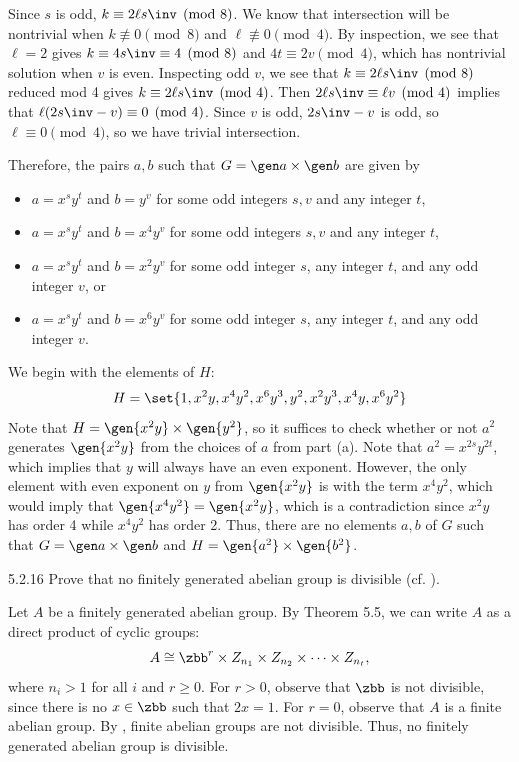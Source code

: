 \begin{solenum}
\begin{enumerate}[label=(\arabic*)]
	Since $s$ is odd, $k \equiv 2 \ell s\inv \pmod 8$.
	We know that intersection will be nontrivial when $k \not\equiv 0 \pmod 8$ and $\ell \not\equiv 0 \pmod 4$.
	By inspection, we see that $\ell = 2$ gives $k \equiv 4s\inv \equiv 4 \pmod 8$ and $4t \equiv 2v \pmod 4$, which has nontrivial solution when $v$ is even.
	Inspecting odd $v$, we see that $k \equiv 2\ell s\inv \pmod 8$ reduced mod 4 gives $k \equiv 2 \ell s\inv \pmod 4$.
	Then $2 \ell s\inv \equiv \ell v \pmod 4$ implies that $\ell(2s\inv - v) \equiv 0 \pmod 4$.
	Since $v$ is odd, $2s\inv - v$ is odd, so $\ell \equiv 0 \pmod 4$, so we have trivial intersection.
    \end{enumerate}
    Therefore, the pairs $a, b$ such that $G = \gen a \times \gen b$ are given by
    \begin{itemize}
        \item $a = x^s y^t$ and $b = y^v$ for some odd integers $s, v$ and any integer $t$,
        \item $a = x^s y^t$ and $b = x^4 y^v$ for some odd integers $s, v$ and any integer $t$,
        \item $a = x^s y^t$ and $b = x^2 y^v$ for some odd integer $s$, any integer $t$, and any odd integer $v$, or
        \item $a = x^s y^t$ and $b = x^6 y^v$ for some odd integer $s$, any integer $t$, and any odd integer $v$.
    \end{itemize}
    \item We begin with the elements of $H$:
    \[
    	H = \set{1, x^2y, x^4y^2, x^6y^3, y^2, x^2y^3, x^4y, x^6y^2}
    \]
    Note that $H = \gen{x^2y} \times \gen{y^2}$, so it suffices to check whether or not $a^2$ generates $\gen{x^2y}$ from the choices of $a$ from part (a).
	Note that $a^2 = x^{2s} y^{2t}$, which implies that $y$ will always have an even exponent.
	However, the only element with even exponent on $y$ from $\gen{x^2y}$ is with the term $x^4y^2$, which would imply that $\gen{x^4y^2} = \gen{x^2y}$, which is a contradiction since $x^2y$ has order 4 while $x^4y^2$ has order 2.
	Thus, there are no elements $a, b$ of $G$ such that $G = \gen a \times \gen b$ and $H = \gen{a^2} \times \gen{b^2}$.
\end{solenum}

\begin{exercise}{5.2.16}
    Prove that no finitely generated abelian group is divisible (cf. ).
\end{exercise}

\begin{sol}
    Let $A$ be a finitely generated abelian group.
	By Theorem 5.5, we can write $A$ as a direct product of cyclic groups:
    \[
    	A \cong \zbb^r \times Z_{n_1} \times Z_{n_2} \times \cdots \times Z_{n_t},
    \]
    where $n_i > 1$ for all $i$ and $r \geq 0$.
	For $r > 0$, observe that $\zbb$ is not divisible, since there is no $x \in \zbb$ such that $2x = 1$.
	For $r = 0$, observe that $A$ is a finite abelian group.
	By , finite abelian groups are not divisible.
	Thus, no finitely generated abelian group is divisible.
\end{sol}